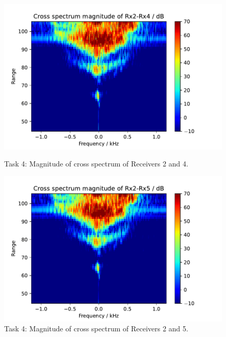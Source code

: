 \begin{figure}[H]
    \centering
    \begin{minipage}{0.48\textwidth}
        \centering
        \includegraphics[width=\textwidth]{graphics/t4/t4-mag-2-4.pdf}
    \caption{Task 4: Magnitude of cross spectrum of Receivers 2 and 4.}
    \label{fig:t4-mag-2-4}
    \end{minipage}\hfill
    \begin{minipage}{0.48\textwidth}
        \centering
             \includegraphics[width=\textwidth]{graphics/t4/t4-mag-2-5.pdf}
    \caption{Task 4: Magnitude of cross spectrum of Receivers 2 and 5.}
    \label{fig:t4-mag-2-5}
    \end{minipage}
\end{figure}

